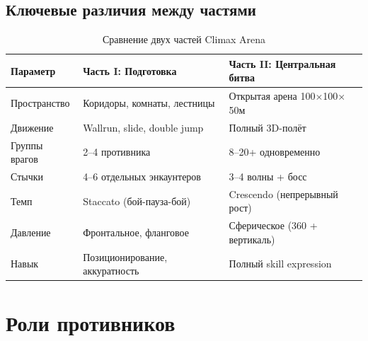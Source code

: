 \documentclass[a4paper,11pt]{report}
\begin{document}

\section{Ключевые различия между частями}

\begin{table}[H]
\centering
\caption{Сравнение двух частей Climax Arena}
\begin{tabularx}{\textwidth}{@{}lXX@{}}
\toprule
\textbf{Параметр} & \textbf{Часть I: Подготовка} & \textbf{Часть II: Центральная битва} \\
\midrule
Пространство & Коридоры, комнаты, лестницы & Открытая арена 100$\times$100$\times$50м \\
Движение & Wallrun, slide, double jump & Полный 3D-полёт \\
Группы врагов & 2--4 противника & 8--20+ одновременно \\
Стычки & 4--6 отдельных энкаунтеров & 3--4 волны + босс \\
Темп & Staccato (бой-пауза-бой) & Crescendo (непрерывный рост) \\
Давление & Фронтальное, фланговое & Сферическое (360\textdegree{} + вертикаль) \\
Навык & Позиционирование, аккуратность & Полный skill expression \\
\bottomrule
\end{tabularx}
\end{table}


\chapter{Роли противников}
\end{document}
